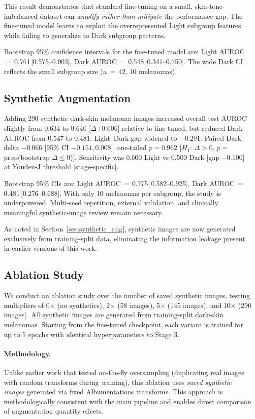 This result demonstrates that standard fine-tuning on a small, skin-tone-imbalanced dataset can \emph{amplify rather than mitigate} the performance gap. The fine-tuned model learns to exploit the overrepresented Light subgroup features while failing to generalize to Dark subgroup patterns.

Bootstrap 95\% confidence intervals for the fine-tuned model are: Light AUROC\,$=$\,0.761\,[0.575--0.903], Dark AUROC\,$=$\,0.548\,[0.341--0.750]. The wide Dark CI reflects the small subgroup size ($n\,{=}\,42$, 10 melanomas).

\subsection{Synthetic Augmentation}

Adding 290 synthetic dark-skin melanoma images increased overall test AUROC slightly from 0.634 to 0.640 [$\Delta$+0.006] relative to fine-tuned, but reduced Dark AUROC from 0.547 to 0.481. Light--Dark gap widened to $-0.291$. Paired Dark delta $-0.066$ [95\% CI $-0.151,0.008$], one-tailed $p=0.962$ [$H_1$: $\Delta>0$, $p=$\,prop(bootstrap $\Delta \leq 0$)]. Sensitivity was 0.600 Light vs 0.500 Dark [gap $-0.100$] at Youden-J threshold [stage-specific].

Bootstrap 95\% CIs are: Light AUROC\,$=$\,0.775\,[0.582--0.925], Dark AUROC\,$=$\,0.481\,[0.276--0.688]. With only 10 melanomas per subgroup, the study is underpowered. Multi-seed repetition, external validation, and clinically meaningful synthetic-image review remain necessary.

As noted in Section~\ref{sec:synthetic_aug}, synthetic images are now generated exclusively from training-split data, eliminating the information leakage present in earlier versions of this work.

\subsection{Ablation Study}

We conduct an ablation study over the number of saved synthetic images, testing multipliers of 0$\times$ (no synthetics), 2$\times$ (58 images), 5$\times$ (145 images), and 10$\times$ (290 images). All synthetic images are generated from training-split dark-skin melanomas. Starting from the fine-tuned checkpoint, each variant is trained for up to 5 epochs with identical hyperparameters to Stage 3.

\paragraph{Methodology.}
Unlike earlier work that tested on-the-fly oversampling (duplicating real images with random transforms during training), this ablation uses \emph{saved synthetic images} generated via fixed Albumentations transforms. This approach is methodologically consistent with the main pipeline and enables direct comparison of augmentation quantity effects.

